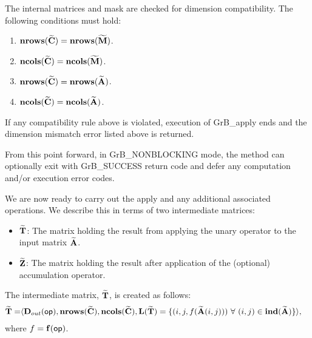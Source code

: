The internal matrices and mask are checked for dimension compatibility. 
The following conditions must hold:
\begin{enumerate}
    \item $\bold{nrows}({\bf \widetilde{C}}) = \bold{nrows}({\bf \widetilde{M}})$.

    \item $\bold{ncols}({\bf \widetilde{C}}) = \bold{ncols}({\bf \widetilde{M}})$.

    \item $\bold{nrows}({\bf \widetilde{C}}) = \bold{nrows}({\bf \widetilde{A}})$.

    \item $\bold{ncols}({\bf \widetilde{C}}) = \bold{ncols}({\bf \widetilde{A}})$.
\end{enumerate}
If any compatibility rule above is violated, execution of {\sf GrB\_apply} ends and 
the dimension mismatch error listed above is returned.

From this point forward, in {\sf GrB\_NONBLOCKING} mode, the method can optionally exit
with {\sf GrB\_SUCCESS} return code and defer any computation and/or execution error codes.

We are now ready to carry out the apply and any additional 
associated operations.  We describe this in terms of two intermediate matrices:
\begin{itemize}
    \item ${\bf \widetilde{T}}$: The matrix holding the result from applying the unary operator to the input matrix
    ${\bf \widetilde{A}}$.

    \item ${\bf \widetilde{Z}}$: The matrix holding the result after 
    application of the (optional) accumulation operator.
\end{itemize}

The intermediate matrix, ${\bf \widetilde{T}}$, is created as follows:
\[
\begin{aligned}
{\bf \widetilde{T}} = & \langle \mbox{$\mathbf{D}_{out}$}({\sf op}),
                           \bold{nrows}({\bf \widetilde{C}}), 
                           \bold{ncols}({\bf \widetilde{C}}),  \bold{L}({\bf \widetilde{T}}) =
	\{(i,j,f({\bf \widetilde{A}}(i,j))) 
\ \forall \ (i,j) \in 
\bold{ind}({\bf \widetilde{A}}) \} \rangle,
\end{aligned}
\]
where $f = \mathbf{f}({\sf op})$.



